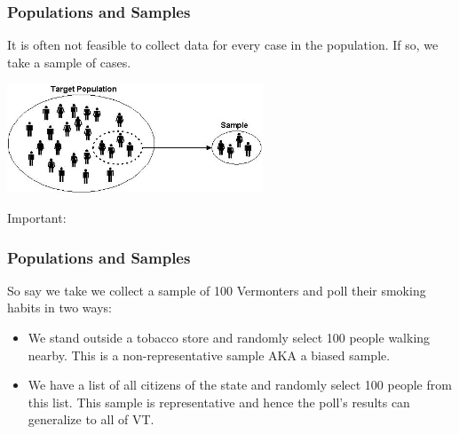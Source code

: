 \documentclass[slides]{beamer}
\newcommand{\blue}[1]{\textcolor{blue2}{#1}}
\begin{document}
\begin{frame}
\frametitle{Populations and Samples}

It is often not feasible to collect data for every case in the population.  If so, we take a \blue{sample} of cases.

\begin{center}
\pause\includegraphics[width=3in]{./figure/target-population.jpg} 
\end{center}

\pause 

Important:
%
%

\end{frame}


\begin{frame}
\frametitle{Populations and Samples}
So say we take we collect a sample of 100 Vermonters and poll their smoking habits in two ways:

\begin{itemize}
\pause\item We stand outside a tobacco store and randomly select 100 people walking nearby.  This is a non-representative sample AKA a \blue{biased sample}.
\pause\item We have a list of all citizens of the state and randomly select 100 people from this list.  This sample is representative and hence the poll's results can generalize to all of VT.  
\end{itemize}

\end{frame}
\end{document}
